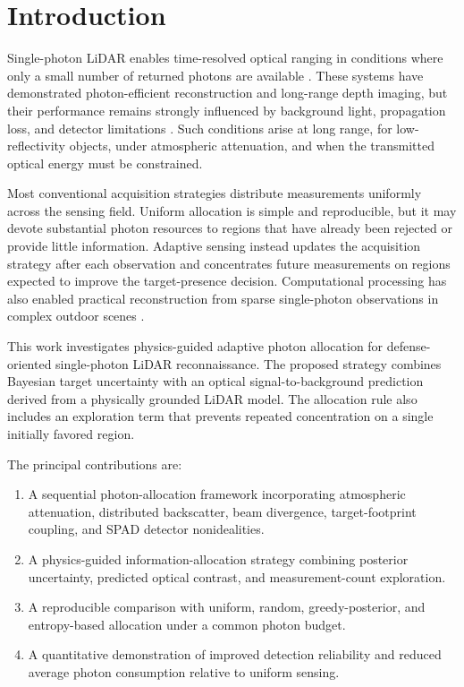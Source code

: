 \section{Introduction}

Single-photon LiDAR enables time-resolved optical ranging in conditions where only a small number of returned photons are available \cite{kirmani2014first,shin2016photon,mccarthy2013kilometre}. These systems have demonstrated photon-efficient reconstruction and long-range depth imaging, but their performance remains strongly influenced by background light, propagation loss, and detector limitations \cite{bruschini2019spad}. Such conditions arise at long range, for low-reflectivity objects, under atmospheric attenuation, and when the transmitted optical energy must be constrained.

Most conventional acquisition strategies distribute measurements uniformly across the sensing field. Uniform allocation is simple and reproducible, but it may devote substantial photon resources to regions that have already been rejected or provide little information. Adaptive sensing instead updates the acquisition strategy after each observation and concentrates future measurements on regions expected to improve the target-presence decision. Computational processing has also enabled practical reconstruction from sparse single-photon observations in complex outdoor scenes \cite{tachella2019realtime}.

This work investigates physics-guided adaptive photon allocation for defense-oriented single-photon LiDAR reconnaissance. The proposed strategy combines Bayesian target uncertainty with an optical signal-to-background prediction derived from a physically grounded LiDAR model. The allocation rule also includes an exploration term that prevents repeated concentration on a single initially favored region.

The principal contributions are:

\begin{enumerate}
    \item A sequential photon-allocation framework incorporating atmospheric attenuation, distributed backscatter, beam divergence, target-footprint coupling, and SPAD detector nonidealities.
    \item A physics-guided information-allocation strategy combining posterior uncertainty, predicted optical contrast, and measurement-count exploration.
    \item A reproducible comparison with uniform, random, greedy-posterior, and entropy-based allocation under a common photon budget.
    \item A quantitative demonstration of improved detection reliability and reduced average photon consumption relative to uniform sensing.
\end{enumerate}
